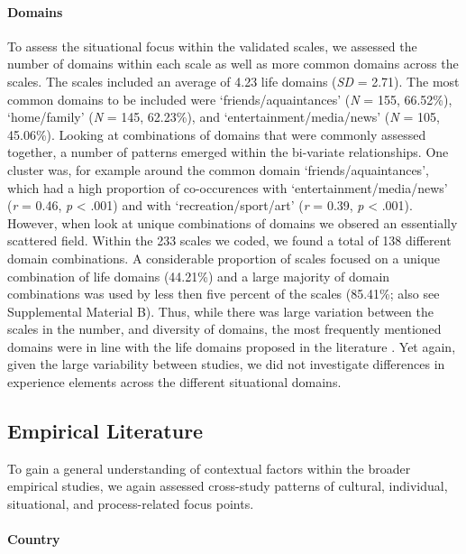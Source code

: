 \paragraph{Domains}

To assess the situational focus within the validated scales, we assessed
the number of domains within each scale as well as more common domains
across the scales. The scales included an average of 4.23 life domains
(\textit{SD} = 2.71). The most common domains to be included were
`friends/aquaintances' (\textit{N} = 155, 66.52\%), `home/family'
(\textit{N} = 145, 62.23\%), and `entertainment/media/news' (\textit{N}
= 105, 45.06\%). Looking at combinations of domains that were commonly
assessed together, a number of patterns emerged within the bi-variate
relationships. One cluster was, for example around the common domain
`friends/aquaintances', which had a high proportion of co-occurences
with `entertainment/media/news' (\textit{r} = 0.46, \textit{p}
\textless{} .001) and with `recreation/sport/art' (\textit{r} = 0.39,
\textit{p} \textless{} .001). However, when look at unique combinations
of domains we obsered an essentially scattered field. Within the 233
scales we coded, we found a total of 138 different domain combinations.
A considerable proportion of scales focused on a unique combination of
life domains (44.21\%) and a large majority of domain combinations was
used by less then five percent of the scales (85.41\%; also see
Supplemental Material B). Thus, while there was large variation between
the scales in the number, and diversity of domains, the most frequently
mentioned domains were in line with the life domains proposed in the
literature \citep[e.g.,][]{Arends-Toth2007}. Yet again, given the large
variability between studies, we did not investigate differences in
experience elements across the different situational domains.

\subsection{Empirical Literature}

To gain a general understanding of contextual factors within the broader
empirical studies, we again assessed cross-study patterns of cultural,
individual, situational, and process-related focus points.

\paragraph{Country}

